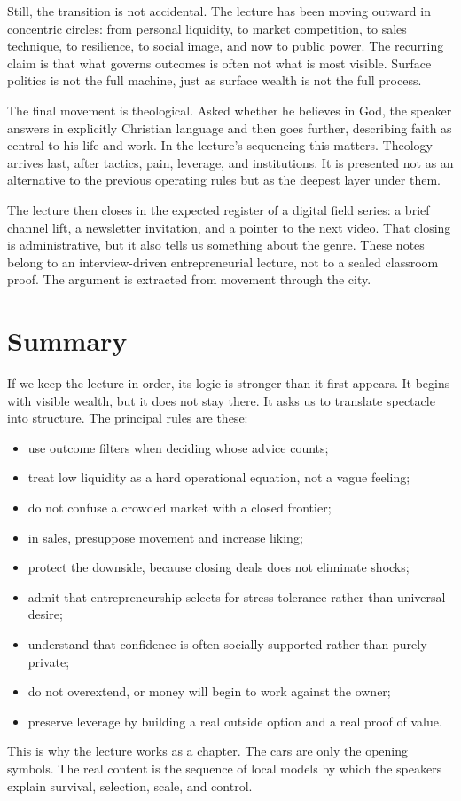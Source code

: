 Still, the transition is not accidental. The lecture has been moving outward in concentric circles: from personal liquidity, to market competition, to sales technique, to resilience, to social image, and now to public power. The recurring claim is that what governs outcomes is often not what is most visible. Surface politics is not the full machine, just as surface wealth is not the full process.

The final movement is theological. Asked whether he believes in God, the speaker answers in explicitly Christian language and then goes further, describing faith as central to his life and work. In the lecture's sequencing this matters. Theology arrives last, after tactics, pain, leverage, and institutions. It is presented not as an alternative to the previous operating rules but as the deepest layer under them.

The lecture then closes in the expected register of a digital field series: a brief channel lift, a newsletter invitation, and a pointer to the next video. That closing is administrative, but it also tells us something about the genre. These notes belong to an interview-driven entrepreneurial lecture, not to a sealed classroom proof. The argument is extracted from movement through the city.

\section{Summary}

If we keep the lecture in order, its logic is stronger than it first appears. It begins with visible wealth, but it does not stay there. It asks us to translate spectacle into structure. The principal rules are these:
\begin{itemize}
\item use outcome filters when deciding whose advice counts;
\item treat low liquidity as a hard operational equation, not a vague feeling;
\item do not confuse a crowded market with a closed frontier;
\item in sales, presuppose movement and increase liking;
\item protect the downside, because closing deals does not eliminate shocks;
\item admit that entrepreneurship selects for stress tolerance rather than universal desire;
\item understand that confidence is often socially supported rather than purely private;
\item do not overextend, or money will begin to work against the owner;
\item preserve leverage by building a real outside option and a real proof of value.
\end{itemize}

This is why the lecture works as a chapter. The cars are only the opening symbols. The real content is the sequence of local models by which the speakers explain survival, selection, scale, and control.